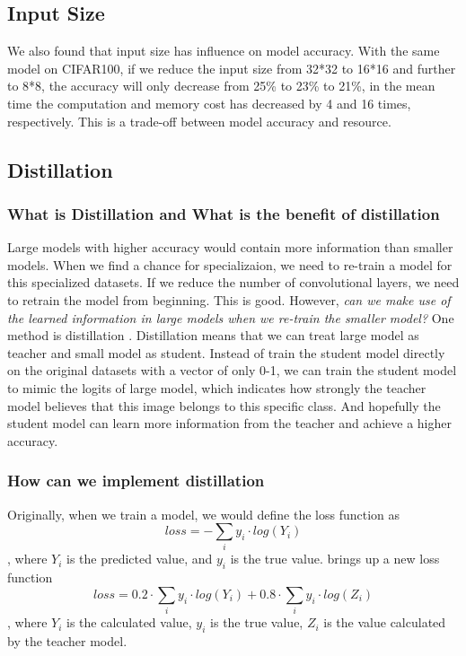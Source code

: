 \documentclass{article}
\begin{document}
\subsection{Input Size}
We also found that input size has influence on model accuracy. With the same model on CIFAR100, if we reduce the input size from 32*32 to 16*16 and further to 8*8, the accuracy will only decrease from 25\% to 23\% to 21\%, in the mean time the computation and memory cost has decreased by 4 and 16 times, respectively. This is a trade-off between model accuracy and resource.



\subsection{Distillation}
\subsubsection{What is Distillation and What is the benefit of distillation}
Large models with higher accuracy would contain more information than smaller models. When we find a chance for specializaion, we need to re-train a model for this specialized datasets. If we reduce the number of convolutional layers, we need to retrain the model from beginning. This is good. However, \textit{can we make use of the learned information in large models when we re-train the smaller model?}  One method is distillation \cite{hinton2015distilling}. Distillation means that we can treat large model as teacher and small model as student. Instead of train the student model directly on the original datasets with a vector of only 0-1, we can train the student model to mimic the logits of large model, which indicates how strongly the teacher model believes that this image belongs to this specific class. And hopefully the student model can learn more information from the teacher and achieve a higher accuracy. 

\subsubsection{How can we implement distillation}
Originally, when we train a model, we would define the loss function as 
\begin{equation}
    loss = - \sum_{i} y_i \cdot log(Y_i)
\end{equation}
, where $Y_i$ is the predicted value, and $y_i$ is the true value. \cite{hinton2015distilling} brings up a new loss function
\begin{equation}
    loss = 0.2 \cdot \sum_{i} y_i \cdot log(Y_i) + 0.8 \cdot \sum_{i} y_i \cdot log(Z_i)
\end{equation}
, where $Y_i$ is the calculated value, $y_i$ is the true value, $Z_i$ is the value calculated by the teacher model.
\end{document}
